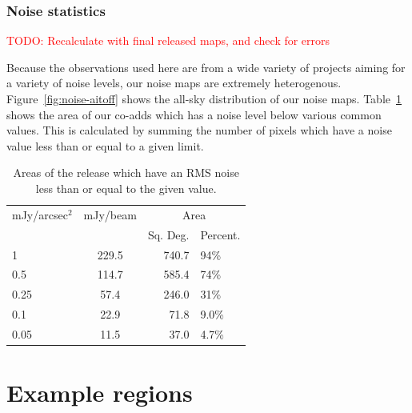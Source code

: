 \documentclass[twocolumn]{aastex6}
\newcommand{\todo}[1]{\textcolor{red}{TODO: #1}}
\begin{document}

\subsubsection{Noise statistics}
\todo{Recalculate with final released maps, and check for errors}

Because the observations used here are from a wide variety of projects
aiming for a variety of noise levels, our noise maps are extremely
heterogenous. Figure~\ref{fig:noise-aitoff} shows the all-sky
distribution of our noise maps. Table~\ref{tab:noises} shows the area
of our co-adds which has a noise level below various common
values. This is calculated by summing the number of
pixels which have a noise value less than or equal to a given limit.


\begin{table}
\centering
\begin{tabular}{l c r l}
  \hline
  mJy/arcsec$^{2}$& mJy/beam  & \multicolumn{2}{c}{Area}\\
                &          &  Sq. Deg. & Percent. \\
  \hline
  1  & 229.5& 740.7 & 94\% \\
  0.5  & 114.7& 585.4 & 74\% \\
  0.25  & 57.4& 246.0 & 31\%\\
  0.1 & 22.9& 71.8 & 9.0\%\\
  0.05 & 11.5& 37.0 & 4.7\%\\
  \hline
\end{tabular}
\caption{Areas of the release which have an RMS noise less than or
  equal to the given value. \label{tab:noises} }
\end{table}

\section{Example regions}
\end{document}
